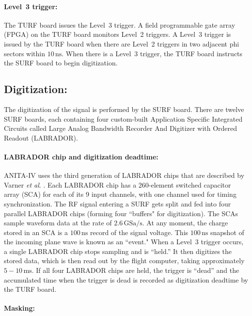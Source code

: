 \documentclass[preprint,12pt]{elsarticle}
\begin{document}
\paragraph{Level~3 trigger:}

The TURF board issues the Level~3 trigger.
A field programmable gate array (FPGA) on the TURF board monitors Level~2 triggers.
A Level~3 trigger is issued by the TURF board when there are Level~2 triggers in two adjacent phi sectors within $10\,\mbox{ns}$. 
When there is a Level~3 trigger, the TURF board instructs 
the SURF board to begin digitization.

\subsection{Digitization:}

The digitization of the signal is performed by the SURF board. 
There are twelve SURF boards, each containing four custom-built Application Specific Integrated
Circuits called Large Analog Bandwidth Recorder And
Digitizer with Ordered Readout (LABRADOR). 

\paragraph{LABRADOR chip and digitization deadtime:}
ANITA-IV uses the third generation
of LABRADOR chips that are described by Varner \textit{et al}. \cite{labrador}. 
Each LABRADOR chip has a 260-element switched capacitor array (SCA) for each of its 9 input channels, with one channel used for timing synchronization.
The RF signal entering a SURF gets split and fed into four parallel LABRADOR chips (forming four ``buffers" for digitization). 
The SCAs sample waveform data at the rate of $2.6\,\mbox{GSa/s}$. 
At any moment, the charge stored in an SCA is a $100\,\mbox{ns}$ record of the signal voltage. 
This $100\,\mbox{ns}$ snapshot of the incoming plane wave is known as an ``event."
When a Level~3 trigger occurs, a single LABRADOR chip stops sampling and is ``held.'' It then digitizes
the stored data, which is then read out by the flight computer, taking approximately $5-10\,\mbox{ms}$.
If all four LABRADOR chips are held, the trigger is ``dead'' and the accumulated time when the trigger is dead is recorded as
digitization deadtime by the TURF board. 

\paragraph{Masking:}
\end{document}
